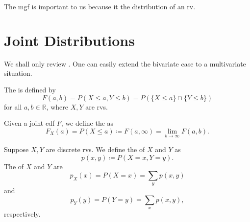 \documentclass[notoc,notitlepage]{tufte-book}
\begin{document}
\begin{note}\label{note:mgf_uniquely_determines_distribution}
  The mgf is important to us because it  the
  distribution of an rv.
\end{note}


\section{Joint Distributions}%
\label{sec:joint_distributions}

We shall only review . One can easily extend
the bivariate case to a multivariate situation.

\begin{defn}\label{defn:joint_cdf}
  The  is defined by
  \begin{equation*}
    F(a, b) = P(X \leq a, Y \leq b) = P(\{ X \leq a \} \cap \{ Y \leq b \})
  \end{equation*}
  for all $a, b \in \mathbb{R}$, where $X, Y$ are rvs.
\end{defn}

\begin{defn}\label{defn:marginal_cdf}
  Given a joint cdf $F$, we define the  as
  \begin{equation*}
    F_X(a) = P(X \leq a) \coloneqq F(a, \infty) = \lim_{b \to \infty} F(a, b).
  \end{equation*}
\end{defn}

\begin{defn}\label{defn:joint_pmf}
  Suppose $X, Y$ are discrete rvs. We define the  of $X$ and $Y$ as
  \begin{equation*}
    p(x, y) \coloneqq P(X = x, Y = y).
  \end{equation*}
  The  of $X$ and $Y$ are
  \begin{equation*}
    p_X(x) = P(X = x) = \sum_{y} p(x, y)
  \end{equation*}
  and
  \begin{equation*}
    p_Y(y) = P(Y = y) = \sum_{x} p(x, y),
  \end{equation*}
  respectively.
\end{defn}
\end{document}
